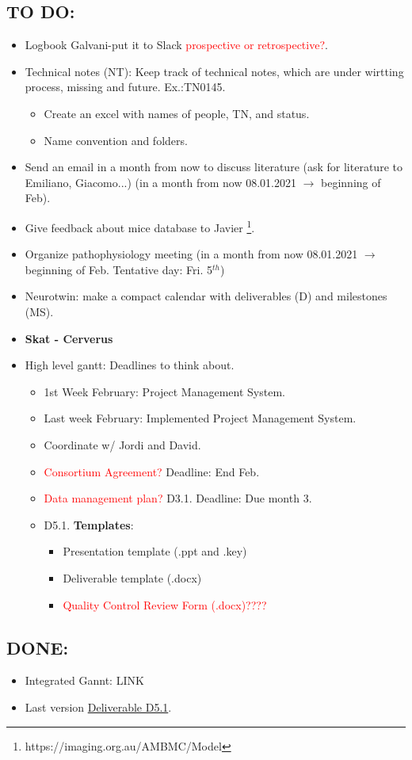 \subsection{TO DO:}
\begin{itemize}
    \item Logbook Galvani-put it to Slack \textcolor{red}{prospective or retrospective?}.
    \item Technical notes (NT): Keep track of technical notes, which are under wirtting process, missing and future. Ex.:TN0145.
    \begin{itemize}
        \item Create an excel with names of people, TN, and status.
        \item Name convention and folders.
    \end{itemize}
    \item Send an email in a month from now to discuss literature (ask for literature to Emiliano, Giacomo...) (in a month from now 08.01.2021 $\rightarrow$ beginning of Feb).
    \item Give feedback about mice database to Javier \footnote{https://imaging.org.au/AMBMC/Model}.
    \item Organize pathophysiology meeting (in a month from now 08.01.2021 $\rightarrow$ beginning of Feb. Tentative day: Fri. 5$^{th}$)
    \item Neurotwin: make a compact calendar with deliverables (D) and milestones (MS).
    \item \textbf{Skat - Cerverus}    
    \item High level gantt: Deadlines to think about.
    \begin{itemize}
        \item 1st Week February: Project Management System.
        \item Last week February: Implemented Project Management System.
        \item Coordinate w/ Jordi and David.
        
\item \textcolor{red}{Consortium Agreement?} Deadline: End Feb.
\item \textcolor{red}{Data management plan?} D3.1. Deadline: Due month 3.
\item D5.1. \textbf{Templates}:
\begin{itemize}
    \item 	Presentation template (.ppt and .key)
    \item Deliverable template (.docx)
    \item \textcolor{red}{Quality Control Review Form (.docx)????}
\end{itemize}

\end{itemize}

\end{itemize}

\subsection{DONE:}
\begin{itemize}
    \item Integrated Gannt: LINK
    \item Last version \href{https://www.dropbox.com/home/998%20-%20neurotwin.eu%20repository/05%20-%20Deliverables?preview=NEUROTWIN+Deliverable+-+D5.1+Quality+Guide_v1.7_CG.docx}{Deliverable D5.1}.
\end{itemize}